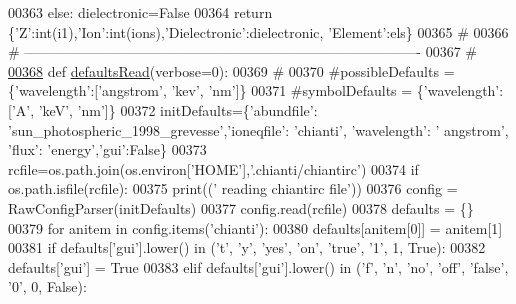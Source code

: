 \begin{DoxyCode}
{{{{00363     \textcolor{keywordflow}{else}: dielectronic=\textcolor{keyword}{False}
00364     \textcolor{keywordflow}{return} \{\textcolor{stringliteral}{'Z'}:int(i1),\textcolor{stringliteral}{'Ion'}:int(ions),\textcolor{stringliteral}{'Dielectronic'}:dielectronic, \textcolor{stringliteral}{'Element'}:els\}
00365     \textcolor{comment}{#}
00366     \textcolor{comment}{# -------------------------------------------------------------------------------------}
00367     \textcolor{comment}{#}
\hypertarget{__chianti__tools_8py_source_l00368}{}\hyperlink{namespacepyneb_1_1utils_1_1__chianti__tools_a235ada2c4e384f436dbade0913107585}{00368} \textcolor{keyword}{def }\hyperlink{namespacepyneb_1_1utils_1_1__chianti__tools_a235ada2c4e384f436dbade0913107585}{defaultsRead}(verbose=0):
00369     \textcolor{comment}{#}
00370     \textcolor{comment}{#possibleDefaults = \{'wavelength':['angstrom', 'kev', 'nm']\}}
00371     \textcolor{comment}{#symbolDefaults = \{'wavelength':['A', 'keV', 'nm']\}}
00372     initDefaults=\{\textcolor{stringliteral}{'abundfile'}: \textcolor{stringliteral}{'sun\_photospheric\_1998\_grevesse'},\textcolor{stringliteral}{'ioneqfile'}: \textcolor{stringliteral}{'chianti'}, \textcolor{stringliteral}{'wavelength'}: \textcolor{stringliteral}{'
      angstrom'}, \textcolor{stringliteral}{'flux'}: \textcolor{stringliteral}{'energy'},\textcolor{stringliteral}{'gui'}:\textcolor{keyword}{False}\}
00373     rcfile=os.path.join(os.environ[\textcolor{stringliteral}{'HOME'}],\textcolor{stringliteral}{'.chianti/chiantirc'})
00374     \textcolor{keywordflow}{if} os.path.isfile(rcfile):
00375         print((\textcolor{stringliteral}{' reading chiantirc file'}))
00376         config = RawConfigParser(initDefaults)
00377         config.read(rcfile)
00378         defaults = \{\}
00379         \textcolor{keywordflow}{for} anitem \textcolor{keywordflow}{in} config.items(\textcolor{stringliteral}{'chianti'}):
00380             defaults[anitem[0]] = anitem[1]
00381         \textcolor{keywordflow}{if} defaults[\textcolor{stringliteral}{'gui'}].lower() \textcolor{keywordflow}{in} (\textcolor{stringliteral}{'t'}, \textcolor{stringliteral}{'y'}, \textcolor{stringliteral}{'yes'}, \textcolor{stringliteral}{'on'}, \textcolor{stringliteral}{'true'}, \textcolor{stringliteral}{'1'}, 1, \textcolor{keyword}{True}):
00382             defaults[\textcolor{stringliteral}{'gui'}] = \textcolor{keyword}{True}
00383         \textcolor{keywordflow}{elif} defaults[\textcolor{stringliteral}{'gui'}].lower() \textcolor{keywordflow}{in} (\textcolor{stringliteral}{'f'}, \textcolor{stringliteral}{'n'}, \textcolor{stringliteral}{'no'}, \textcolor{stringliteral}{'off'}, \textcolor{stringliteral}{'false'}, \textcolor{stringliteral}{'0'}, 0, \textcolor{keyword}{False}):
}}}}
\end{DoxyCode}
